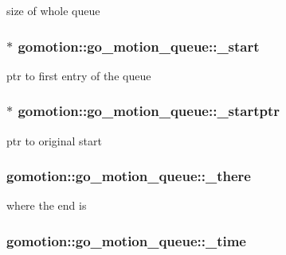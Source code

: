 size of whole queue 

\hypertarget{structgomotion_1_1go__motion__queue_aa48dfdfd799a6cf63856b760d264c23b}{
\subsubsection[{\-\_\-start}]{$\ast$ gomotion\-::go\-\_\-motion\-\_\-queue\-::\-\_\-start}}\label{structgomotion_1_1go__motion__queue_aa48dfdfd799a6cf63856b760d264c23b}


ptr to first entry of the queue 

\hypertarget{structgomotion_1_1go__motion__queue_a0115449f0ee391d3e1d473e5861d594e}{
\subsubsection[{\-\_\-startptr}]{$\ast$ gomotion\-::go\-\_\-motion\-\_\-queue\-::\-\_\-startptr}}\label{structgomotion_1_1go__motion__queue_a0115449f0ee391d3e1d473e5861d594e}


ptr to original start 

\hypertarget{structgomotion_1_1go__motion__queue_a96ac4977f0e8c0a01930f945262015fa}{
\subsubsection[{\-\_\-there}]{ gomotion\-::go\-\_\-motion\-\_\-queue\-::\-\_\-there}}\label{structgomotion_1_1go__motion__queue_a96ac4977f0e8c0a01930f945262015fa}


where the end is 

\hypertarget{structgomotion_1_1go__motion__queue_a9f72301ca7a9a96fde11f519c097cdaf}{
\subsubsection[{\-\_\-time}]{ gomotion\-::go\-\_\-motion\-\_\-queue\-::\-\_\-time}}\label{structgomotion_1_1go__motion__queue_a9f72301ca7a9a96fde11f519c097cdaf}


